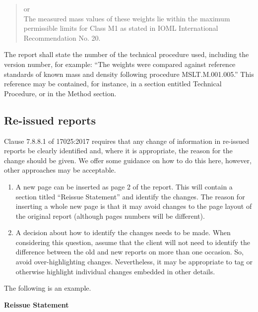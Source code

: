 \begin{quote}
\begin{tabbing}
\begin{minipage}[t]{.7\textwidth}
or\\

The measured mass values of these weights lie within the maximum\\ 
permissible limits for Class M1 as stated in IOML International \\
Recommendation No. 20. 

\end{minipage}
\end{tabbing}
\end{quote}

The report shall state the number of the technical procedure used, including the version number, for example: ``The weights were compared against reference standards of known mass and density following procedure MSLT.M.001.005.''  This reference may be contained, for instance, in a section entitled Technical Procedure, or in the Method section.

\subsection{Re-issued reports}
 \label{ss:reissued_reports}
Clause 7.8.8.1 of 17025:2017 requires that any change of information in re-issued reports be clearly identified and, where it is appropriate, the reason for the change should be given. We offer some guidance on how to do this here, however, other approaches may be acceptable.
\begin{enumerate}
\item	A new page can be inserted as page 2 of the report. This will contain a section titled ``Reissue Statement'' and identify the changes. The reason for inserting a whole new page is that it may avoid changes to the page layout of the original report (although pages numbers will be different).
\item	A decision about how to identify the changes needs to be made. When considering this question, assume that the client will not need to identify the difference between the old and new reports on more than one occasion. So, avoid over-highlighting changes. Nevertheless, it may be appropriate to tag or otherwise highlight individual changes embedded in other details. 
\end{enumerate}
The following is an example.

\textbf{\large Reissue Statement}\\

